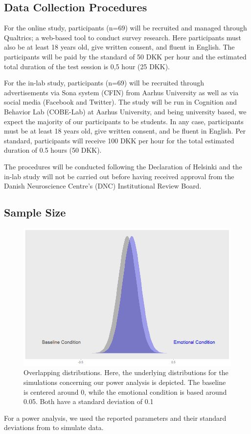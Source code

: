 \documentclass{article}
\begin{document}
    \subsection{Data Collection Procedures}

    For the online study, participants (n=69) will be recruited and managed through Qualtrics; a web-based tool to conduct survey research. Here participants must also be at least 18 years old, give written consent, and fluent in English. The participants will be paid by the standard of 50 DKK per hour and the estimated total duration of the test session is 0,5 hour (25 DKK). 

For the in-lab study, participants (n=69) will be recruited through advertisements via Sona system (CFIN) from Aarhus University as well as via social media (Facebook and Twitter). The study will be run in Cognition and Behavior Lab (COBE-Lab) at Aarhus University, and being university based, we expect the majority of our participants to be students. In any case, participants must be at least 18 years old, give written consent, and be fluent in English. 
Per standard, participants will receive 100 DKK per hour for the total estimated duration of 0.5 hours (50 DKK).

The procedures will be conducted following the Declaration of Helsinki and the in-lab study will not be carried out before having received approval from the Danish Neuroscience Centre’s (DNC) Institutional Review Board.

    \subsection{Sample Size}

    \begin{figure}[H]
        \begin{centering}
        \includegraphics[width = \textwidth]{figures/distributions.png}
        \caption{Overlapping distributions. Here, the underlying distributions for the simulations concerning our power analysis is depicted. The baseline is centered around 0, while the emotional condition is based around 0.05. Both have a standard deviation of 0.1}
        \end{centering}
    \end{figure}
    For a power analysis, we used the reported parameters and their standard deviations from  to simulate data.
\end{document}
